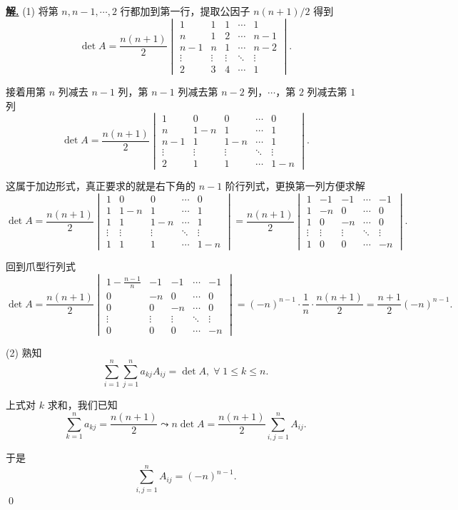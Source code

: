 \documentclass[10pt,openany]{article}
\theoremstyle{thmstyle} %
\theoremstyle{defstyle} %
\theoremstyle{prostyle} %
\theoremstyle{exastyle}
\theoremstyle{remstyle}
\newenvironment{solution}{\par\underline{\textbf{解.}} \;\fangsong}{\qed\par}
\begin{document}
\begin{solution}
	(1) 将第 \( n, n-1, \cdots, 2 \) 行都加到第一行，提取公因子 \( n(n+1)/2 \) 得到
	\[ \det A = \frac{n(n+1)}{2}\begin{vmatrix}
		1 & 1 & 1 & \cdots & 1 \\
		n & 1 & 2 & \cdots & n-1 \\
		n-1 & n & 1 & \cdots & n-2 \\
		\vdots & \vdots & \vdots & \ddots & \vdots \\
		2 & 3 & 4 & \cdots & 1
	\end{vmatrix}. \]
	
	接着用第 \( n \) 列减去 \( n-1 \) 列，第 \( n-1 \) 列减去第 \( n-2 \) 列，\( \cdots \)，第 \( 2 \) 列减去第 \( 1 \) 列
	\[ \det A = \frac{n(n+1)}{2}\begin{vmatrix}
		1 & 0 & 0 & \cdots & 0 \\
		n & 1-n & 1 & \cdots & 1 \\
		n-1 & 1 & 1-n & \cdots & 1 \\
		\vdots & \vdots & \vdots & \ddots & \vdots \\
		2 & 1 & 1 & \cdots & 1-n
	\end{vmatrix}. \]
	
	这属于加边形式，真正要求的就是右下角的 \( n-1 \) 阶行列式，更换第一列方便求解
	\[ \det A = \frac{n(n+1)}{2}\begin{vmatrix}
		1 & 0 & 0 & \cdots & 0 \\
		1 & 1-n & 1 & \cdots & 1 \\
		1 & 1 & 1-n & \cdots & 1 \\
		\vdots & \vdots & \vdots & \ddots & \vdots \\
		1 & 1 & 1 & \cdots & 1-n
	\end{vmatrix}= \frac{n(n+1)}{2}\begin{vmatrix}
	1 & -1 & -1 & \cdots & -1 \\
	1 & -n & 0 & \cdots & 0 \\
	1 & 0 & -n & \cdots & 0 \\
	\vdots & \vdots & \vdots & \ddots & \vdots \\
	1 & 0 & 0 & \cdots & -n
	\end{vmatrix}. \]
	
	回到爪型行列式
	\[ \det A= \frac{n(n+1)}{2}\begin{vmatrix}
		1-\frac{n-1}{n} & -1 & -1 & \cdots & -1 \\[2ex]
		0 & -n & 0 & \cdots & 0 \\
		0 & 0 & -n & \cdots & 0 \\
		\vdots & \vdots & \vdots & \ddots & \vdots \\
		0 & 0 & 0 & \cdots & -n
	\end{vmatrix}= (-n)^{n-1} \cdot \frac{1}{n} \cdot \frac{n(n+1)}{2}= \frac{n+1}{2} (-n)^{n-1}. \]
	
	(2) 熟知
	\[ \sum_{i=1}^{n}\sum_{j=1}^{n} a_{kj}A_{ij}= \det A, \; \forall \; 1 \leq k \leq n. \]
	
	上式对 \( k \) 求和，我们已知
	\[ \sum_{k=1}^{n} a_{kj}= \frac{n(n+1)}{2} \leadsto n\det A= \frac{n(n+1)}{2} \sum_{i,j=1}^{n} A_{ij}. \]
	
	于是
	\[ \sum_{i,j=1}^{n} A_{ij}=(-n)^{n-1}. \]
\end{solution}
\end{document}

